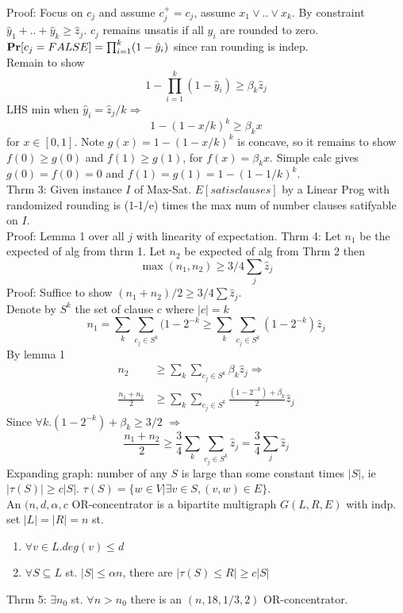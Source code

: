 \documentclass[a4paper]{article}
\def\Pr{\mbox{\textbf{Pr}}}
\begin{document}
Proof: Focus on \(c_j\) and assume \(c_j^+=c_j\), assume \(x_1 \vee .. \vee x_k\).
By constraint \(\hat{y}_1+..+\hat{y}_k \geq \hat{z}_j\). \(c_j\) remains unsatis if all \(y_i\) are rounded to zero.\\
\(\Pr[c_j=FALSE]=\prod_{i=1}^k(1-\hat{y}_i)\) since ran rounding is indep.\\
Remain to show
\[ 1-\prod_{i=1}^k (1 - \hat{y}_i) \geq \beta_k \hat{z}_j\]
LHS min when \(\hat{y}_i = \hat{z}_j/k \Rightarrow\)
\[1-(1-x/k)^k \geq \beta_{k} x\]
for \(x\in[0,1]\). Note \(g(x) = 1-(1-x/k)^k\) is concave, so it remains to show \(f(0)\geq g(0)\) and \(f(1) \geq g(1)\), for \(f(x)=\beta_k x\). Simple calc gives \(g(0)=f(0)=0\) and \(f(1)=g(1)=1-(1-1/k)^k\).\\
Thrm 3: Given instance \(I\) of Max-Sat. \(E[satis clauses]\) by a Linear Prog with randomized rounding is (1-1/e) times the max num of number clauses satifyable on \(I\).\\
Proof: Lemma 1 over all \(j\) with linearity of expectation. 
Thrm 4: Let \(n_1\) be the expected of alg from thrm 1. Let \(n_2\) be expected of alg from Thrm 2 then 
\[\max(n_1,n_2)\geq 3/4 \sum_j \hat{z}_j\]
Proof: Suffice to show  \((n_1 + n_2)/2 \geq 3/4 \sum \hat{z}_j\).\\
Denote by \(S^k\) the set of clause \(c\) where \(|c|=k\)
\[n_1 = \sum_k \sum_{c_j \in S^k} (1-2^{-k} \geq \sum_k \sum_{c_j \in S^k} (1-2^{-k})\hat{z}_j\]
By lemma 1
\begin{align*}
n_2 &\geq \sum_k \sum_{c_j \in S^k} \beta_k \hat{z}_j \Rightarrow\\
\frac{n_1+n_2}{2} &\geq \sum_k \sum_{c_j \in S^k} \frac{(1-2^{-k})+\beta_k}{2}\hat{z}_j
\end{align*}
Since \( \forall k. (1-2^{-k}) + \beta_k \geq 3/2\) \(\Rightarrow\)
\[\frac{n_1+n_2}{2} \geq \frac{3}{4} \sum_k\sum_{c_j \in S^k} \hat{z}_j = \frac{3}{4} \sum_j \hat{z}_j\]
Expanding graph: number of any \(S\) is large than some constant times \(|S|\), ie \(|\tau(S)| \geq c|S|\). \(\tau(S)= \{w\in V| \exists v\in S,(v,w) \in E\}\).\\
An \((n,d,\alpha,c\) OR-concentrator is a bipartite multigraph \(G(L,R,E)\) with indp. set \(|L|=|R|=n\) st.
\begin{enumerate}
\item \(\forall v\in L. deg(v)\leq d\)
\item \(\forall S \subseteq L\) st. \(|S| \leq \alpha n\), there are \(|\tau(S)\leq R| \geq c|S|\)
\end{enumerate}
Thrm 5: \(\exists n_0\) st. \(\forall n > n_0\) there is an \((n,18,1/3,2)\) OR-concentrator.\\
\end{document}
